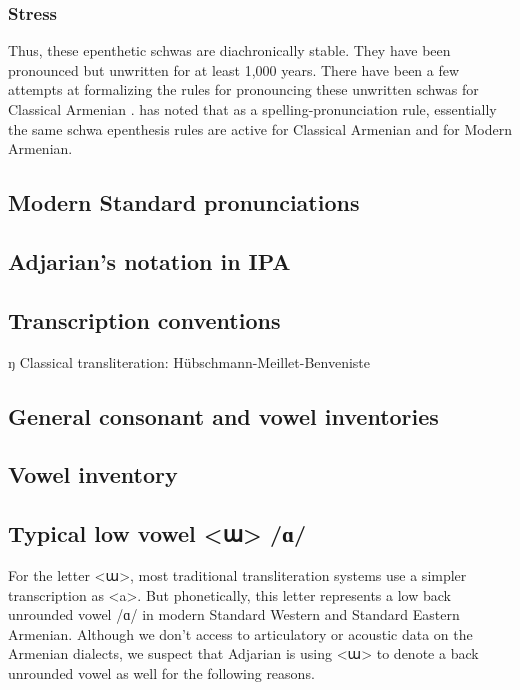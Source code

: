 \subsubsection{Stress}


%
Thus, these epenthetic schwas are diachronically stable. They have been pronounced but unwritten for at least 1,000 years. 
There have been a few attempts at formalizing the rules for pronouncing these unwritten schwas for Classical Armenian \citep{Hammalian-1984-PhonoOldArmenian,Schwink-1994-ArmenianSchwaLexicalized,Pierce-2007-SchwaClassicalArmenian}. \citet{Pierce-2007-SchwaClassicalArmenian} has noted that as a spelling-pronunciation rule, essentially the same schwa epenthesis rules  are active for Classical Armenian and for Modern Armenian.



\subsection{Modern Standard pronunciations}
\subsection{Adjarian's notation in IPA}

\subsection{Transcription conventions}

ŋ
Classical transliteration: Hübschmann-Meillet-Benveniste

\subsection{General consonant and vowel inventories}

\subsection{Vowel inventory}


\subsection{Typical low vowel <ա>  /ɑ/}

For the letter <ա>, most traditional transliteration systems use a simpler transcription as <a>.  But phonetically, this letter represents a low back unrounded vowel /ɑ/ in modern Standard Western and Standard Eastern Armenian. Although we don't access to articulatory or acoustic data on the Armenian dialects, we suspect that Adjarian is using <ա> to denote a back unrounded vowel as well  for the following reasons. 


